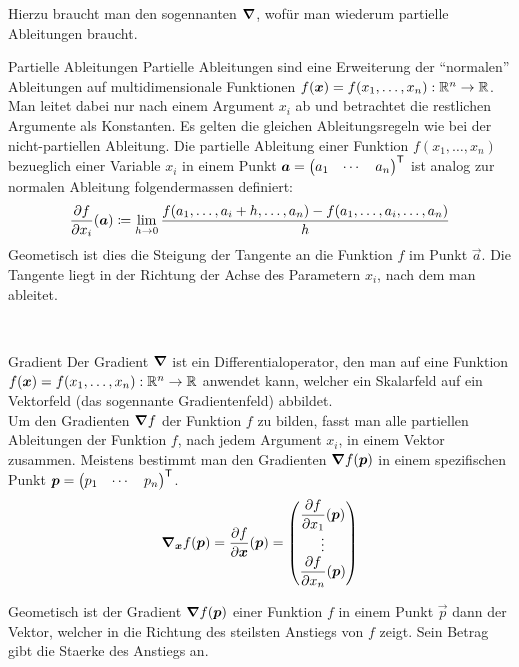Hierzu braucht man den sogennanten  $\bm{\nabla}$, wofür man wiederum partielle Ableitungen braucht.
\para{}
\begin{defbox}{Partielle Ableitungen}\label{ref:partielle_ableitungen}
  Partielle Ableitungen sind eine Erweiterung der ``normalen'' Ableitungen auf
  multidimensionale Funktionen $f(\bm{x}) = f(x_1,\ldots,x_n): \mathbb{R}^n \to \mathbb{R}$.
  Man leitet dabei nur nach einem Argument $x_i$ ab und betrachtet die restlichen Argumente als Konstanten.
  Es gelten die gleichen Ableitungsregeln wie bei der nicht-partiellen Ableitung.
  Die partielle Ableitung einer Funktion $f(x_1,\ldots,x_n)$ bezueglich einer
  Variable $x_i$ in einem Punkt $\bm{a} = \begin{pmatrix} a_1 & \cdots & a_n \end{pmatrix}^{\mathsf{T}}$
  ist analog zur normalen Ableitung folgendermassen definiert:
  \begin{equation*}
    \frac{\partial f}{\partial x_i}(\bm{a}) \coloneqq \lim_{h \to 0} \frac{f(a_1,\ldots,a_i + h,\ldots,a_n)-f(a_1,\ldots,a_i,\ldots,a_n)}{h}
  \end{equation*}
  Geometisch ist dies die Steigung der Tangente an die Funktion $f$ im Punkt
  $\vec{a}$. Die Tangente liegt in der Richtung der Achse des Parametern $x_i$, nach dem man ableitet.
\end{defbox}
\\
\begin{defbox}{Gradient}
  Der Gradient $\bm{\nabla}$ ist ein Differentialoperator, den man auf eine
  Funktion $f(\bm{x}) = f(x_1,\ldots,x_n): \mathbb{R}^n \to \mathbb{R}$ anwendet kann, welcher ein Skalarfeld auf ein Vektorfeld (das sogennante Gradientenfeld) abbildet.\\
  Um den Gradienten $\bm{\nabla}f$ der Funktion $f$ zu bilden, fasst man alle partiellen Ableitungen der Funktion $f$, nach jedem
  Argument $x_i$, in einem Vektor zusammen. Meistens bestimmt man den Gradienten
  $\bm{\nabla} f(\bm{p})$ in einem spezifischen Punkt $\bm{p} =
  \begin{pmatrix} p_1 & \cdots & p_n \end{pmatrix}^{\mathsf{T}}$.
  \begin{equation*}
    \bm{\nabla}_{\bm{x}} f(\bm{p}) = \displaystyle\frac{\partial f}{\partial \bm{x}}(\bm{p}) =
    \begin{pmatrix}
      \displaystyle\frac{\partial f}{\partial x_1}(\bm{p}) \\
      \vdots \\
      \displaystyle\frac{\partial f}{\partial x_n}(\bm{p}) \\
    \end{pmatrix}
  \end{equation*}

  Geometisch ist der Gradient $\bm{\nabla}f(\bm{p})$ einer Funktion $f$ in
  einem Punkt $\vec{p}$ dann der Vektor, welcher in die Richtung des steilsten
  Anstiegs von $f$ zeigt. Sein Betrag gibt die Staerke des Anstiegs an.
\end{defbox}
